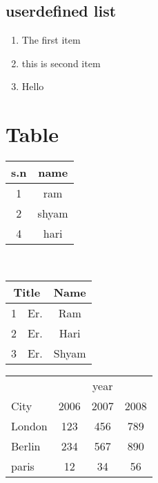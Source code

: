 \documentclass[12pt]{article}
\begin{document}
\subsection{userdefined list}
\begin{enumerate}[step 1]
\item The first item
\item this is second item
\item Hello
\end{enumerate}

\section{Table}
\begin{tabular}{|c|c|}
\hline 
s.n & name \\ 
\hline 
1 & ram \\ 
\hline 
2 & shyam \\ 
\hline 
4 & hari \\ 
\hline 
\end{tabular} \\

\begin{tabular}{|c|c|c|}
\hline 
\multicolumn{2}{|c|}{Title} & Name \\ 
\hline 
1 & Er. & Ram \\ 
\hline 
2 & Er. & Hari \\ 
\hline 
3 & Er. & Shyam \\ 
\hline 
\end{tabular} 

\center
\begin{tabular}{l|ccc}
&\multicolumn{3}{c}{year} \\ 
\cline{2-4} 
City & 2006 & 2007 & 2008 \\ 
\hline 
London & 123 & 456 & 789 \\ 

Berlin & 234 & 567 & 890 \\ 

paris & 12 & 34 & 56 \\ 

\end{tabular} 
\end{document}
